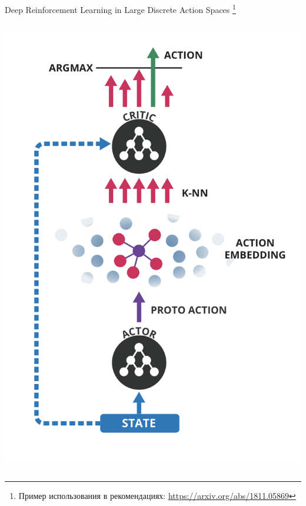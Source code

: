 \documentclass[11pt,aspectratio=169,handout]{beamer}
\begin{document}
\begin{frame}{Deep Reinforcement Learning in Large Discrete Action Spaces \cite{DDPG}\footnote{Пример использования в рекомендациях: \url{https://arxiv.org/abs/1811.05869}}}

\begin{columns}
\begin{column}{0.4\textwidth}
\begin{center}
\includegraphics[scale=0.25]{images/ddpg.png}
\end{center}
\end{column}


\end{columns}
\end{frame}
\end{document}
